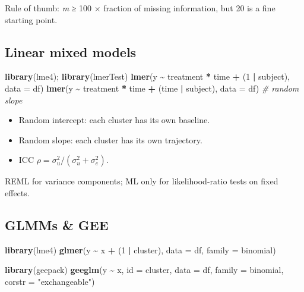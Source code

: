 \documentclass[
]{article}
\newenvironment{Shaded}{\begin{snugshade}}{\end{snugshade}}
\newcommand{\AttributeTok}[1]{\textcolor[rgb]{0.13,0.29,0.53}{#1}}
\newcommand{\CommentTok}[1]{\textcolor[rgb]{0.56,0.35,0.01}{\textit{#1}}}
\newcommand{\DecValTok}[1]{\textcolor[rgb]{0.00,0.00,0.81}{#1}}
\newcommand{\FunctionTok}[1]{\textcolor[rgb]{0.13,0.29,0.53}{\textbf{#1}}}
\newcommand{\NormalTok}[1]{#1}
\newcommand{\SpecialCharTok}[1]{\textcolor[rgb]{0.81,0.36,0.00}{\textbf{#1}}}
\newcommand{\StringTok}[1]{\textcolor[rgb]{0.31,0.60,0.02}{#1}}
\providecommand{\tightlist}{%
  \setlength{\itemsep}{0pt}\setlength{\parskip}{0pt}}
\begin{document}
Rule of thumb: \emph{m} ≥ 100 × fraction of missing information, but 20
is a fine starting point.

\subsection{Linear mixed models}\label{linear-mixed-models}

\begin{Shaded}
\begin{Highlighting}[]
\FunctionTok{library}\NormalTok{(lme4); }\FunctionTok{library}\NormalTok{(lmerTest)}
\FunctionTok{lmer}\NormalTok{(y }\SpecialCharTok{\textasciitilde{}}\NormalTok{ treatment }\SpecialCharTok{*}\NormalTok{ time }\SpecialCharTok{+}\NormalTok{ (}\DecValTok{1} \SpecialCharTok{|}\NormalTok{ subject), }\AttributeTok{data =}\NormalTok{ df)}
\FunctionTok{lmer}\NormalTok{(y }\SpecialCharTok{\textasciitilde{}}\NormalTok{ treatment }\SpecialCharTok{*}\NormalTok{ time }\SpecialCharTok{+}\NormalTok{ (time }\SpecialCharTok{|}\NormalTok{ subject), }\AttributeTok{data =}\NormalTok{ df)  }\CommentTok{\# random slope}
\end{Highlighting}
\end{Shaded}

\begin{itemize}
\tightlist
\item
  Random intercept: each cluster has its own baseline.
\item
  Random slope: each cluster has its own trajectory.
\item
  ICC \(\rho = \sigma_u^2 / (\sigma_u^2 + \sigma_e^2)\).
\end{itemize}

REML for variance components; ML only for likelihood-ratio tests on
fixed effects.

\subsection{GLMMs \& GEE}\label{glmms-gee}

\begin{Shaded}
\begin{Highlighting}[]
\FunctionTok{library}\NormalTok{(lme4)}
\FunctionTok{glmer}\NormalTok{(y }\SpecialCharTok{\textasciitilde{}}\NormalTok{ x }\SpecialCharTok{+}\NormalTok{ (}\DecValTok{1} \SpecialCharTok{|}\NormalTok{ cluster), }\AttributeTok{data =}\NormalTok{ df, }\AttributeTok{family =}\NormalTok{ binomial)}

\FunctionTok{library}\NormalTok{(geepack)}
\FunctionTok{geeglm}\NormalTok{(y }\SpecialCharTok{\textasciitilde{}}\NormalTok{ x, }\AttributeTok{id =}\NormalTok{ cluster, }\AttributeTok{data =}\NormalTok{ df,}
       \AttributeTok{family =}\NormalTok{ binomial, }\AttributeTok{corstr =} \StringTok{"exchangeable"}\NormalTok{)}
\end{Highlighting}
\end{Shaded}
\end{document}
